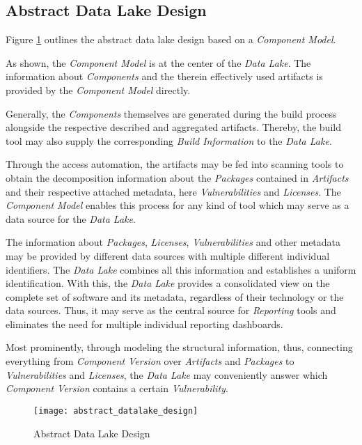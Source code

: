 \subsection{Abstract Data Lake Design}
Figure \ref{fig:AbstractDataLakeDesign} outlines the abstract data lake design based on a \emph{Component Model}.\par
As shown, the \emph{Component Model} is at the center of the \emph{Data Lake}. The information about \emph{Components} and the therein effectively used artifacts is provided by the \emph{Component Model} directly.\par
Generally, the \emph{Components} themselves are generated during the build process alongside the respective described and aggregated artifacts. Thereby, the build tool may also supply the corresponding \emph{Build Information} to the \emph{Data Lake}.\par
Through the access automation, the artifacts may be fed into scanning tools to obtain the  decomposition information about the \emph{Packages} contained in \emph{Artifacts} and their respective attached metadata, here \emph{Vulnerabilities} and \emph{Licenses}. The \emph{Component Model} enables this process for any kind of tool which may serve as a data source for the \emph{Data Lake}.\par
The information about \emph{Packages}, \emph{Licenses}, \emph{Vulnerabilities} and other metadata may be provided by different data sources with multiple different individual identifiers. The \emph{Data Lake} combines all this information and establishes a uniform identification. With this, the \emph{Data Lake} provides a consolidated view on the complete set of software and its metadata, regardless of their technology or the data sources. Thus, it may serve as the central source for \emph{Reporting} tools and eliminates the need for multiple individual reporting dashboards.\par
Most prominently, through modeling the structural information, thus, connecting everything from \emph{Component Version} over \emph{Artifacts} and \emph{Packages} to \emph{Vulnerabilities} and \emph{Licenses}, the \emph{Data Lake} may conveniently answer which \emph{Component Version} contains a certain \emph{Vulnerability}. 

\begin{figure}[H]
	\centering
	\texttt{[image: abstract\_datalake\_design]}
	\caption[Abstract Data Lake Design]{Abstract Data Lake Design }
	\label{fig:AbstractDataLakeDesign}
\end{figure}


